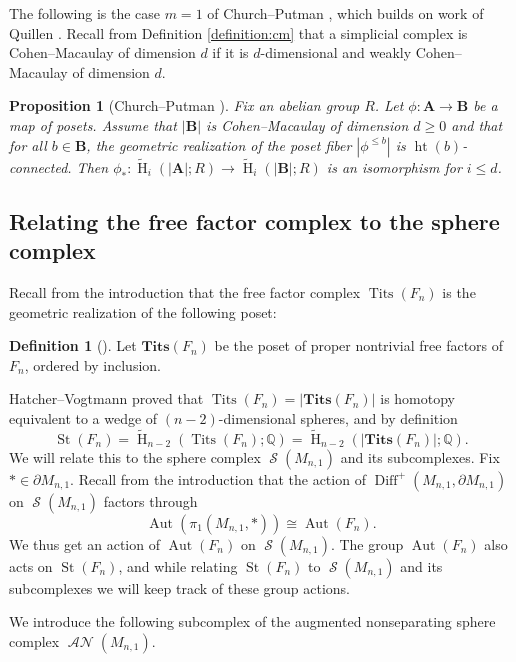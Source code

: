 \documentclass[11pt]{amsart}
\numberwithin{equation}{section}
\theoremstyle{plain}
\newtheorem{proposition}[theorem]{Proposition}
\theoremstyle{definition}
\newtheorem{defn}[theorem]{Definition}
\newenvironment{definition}[1][]{\begin{defn}[#1]\pushQED{\qed}}{\popQED \end{defn}}
\theoremstyle{remark}
\DeclareMathOperator{\Diff}{Diff}
\newcommand\Q{\ensuremath{\mathbb{Q}}}
\DeclareMathOperator{\HH}{H}
\newcommand\RH{\ensuremath{\widetilde{\HH}}}
\DeclareMathOperator{\Aut}{Aut}
\newcommand\bA{\ensuremath{\mathbf{A}}}
\newcommand\bB{\ensuremath{\mathbf{B}}}
\newcommand\BTits{\ensuremath{\mathbf{Tits}  }}
\DeclareMathOperator{\Tits}{Tits}
\DeclareMathOperator{\St}{St}
\DeclareMathOperator{\Spheres}{\mathcal{S}}
\DeclareMathOperator{\ANSpheres}{\mathcal{AN}}
\DeclareMathOperator{\height}{ht}
\begin{document}
The following is the case $m=1$ of Church--Putman \cite[Proposition 2.3]{ChurchPutmanCodim1}, which
builds on work of Quillen \cite{QuillenPoset}.  Recall from Definition \ref{definition:cm} that
a simplicial complex is Cohen--Macaulay of dimension $d$ if it is $d$-dimensional and weakly Cohen--Macaulay of
dimension $d$.

\begin{proposition}[{Church--Putman \cite[Proposition 2.3]{ChurchPutmanCodim1}}]
\label{proposition:posetfiber}
Fix an abelian group $R$.  Let $\phi\colon \bA \rightarrow \bB$ be a map of posets.  Assume that $|\bB|$ is 
Cohen--Macaulay of dimension $d \geq 0$ and that for all $b \in \bB$, the geometric realization of the poset fiber
$|\phi^{\leq b}|$ is $\height(b)$-connected.  Then
$\phi_{\ast}\colon \RH_i(|\bA|;R) \rightarrow \RH_i(|\bB|;R)$ is an isomorphism for $i \leq d$.
\end{proposition}

\subsection{Relating the free factor complex to the sphere complex}
Recall from the introduction that the free factor complex $\Tits(F_n)$ is the geometric
realization of the following poset:

\begin{definition}
Let $\BTits(F_n)$ be the poset of proper nontrivial free factors of $F_n$, ordered
by inclusion.
\end{definition}

Hatcher--Vogtmann \cite{HatcherVogtmann, HatcherVogtmannRevised} proved that $\Tits(F_n) = |\BTits(F_n)|$ is homotopy
equivalent to a wedge of $(n-2)$-dimensional spheres, and by definition
\[\St(F_n) = \RH_{n-2}(\Tits(F_n);\Q) = \RH_{n-2}(|\BTits(F_n)|;\Q).\]
We will relate this to the sphere complex $\Spheres(M_{n,1})$ and its subcomplexes.  Fix $\ast \in \partial M_{n,1}$.  
Recall from the introduction that the action of
$\Diff^{+}(M_{n,1},\partial M_{n,1})$ on $\Spheres(M_{n,1})$ factors through
\[\Aut(\pi_1(M_{n,1},\ast)) \cong \Aut(F_n).\]
We thus get an action of $\Aut(F_n)$ on $\Spheres(M_{n,1})$.  The group $\Aut(F_n)$
also acts on $\St(F_n)$, and while relating $\St(F_n)$ to $\Spheres(M_{n,1})$ and
its subcomplexes we will keep track of these group actions.

We introduce the following subcomplex of the augmented nonseparating sphere complex $\ANSpheres(M_{n,1})$. 
\end{document}
